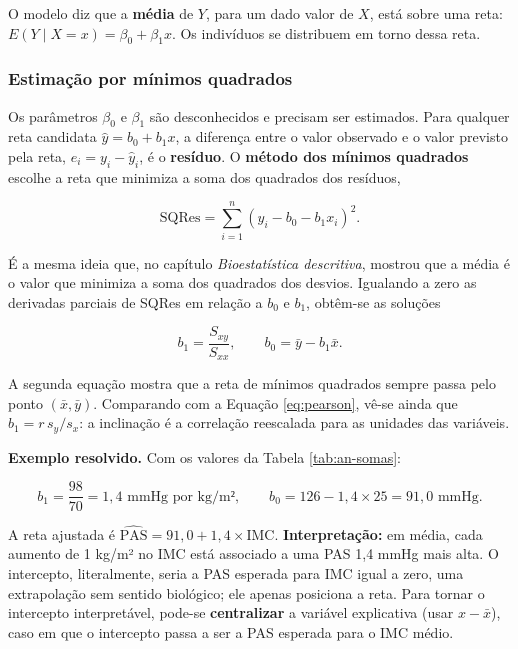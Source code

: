 \documentclass[
]{book}
\begin{document}
O modelo diz que a \textbf{média} de \(Y\), para um dado valor de \(X\), está sobre uma reta: \(E(Y \mid X = x) = \beta_0 + \beta_1 x\). Os indivíduos se distribuem em torno dessa reta.

\subsubsection{Estimação por mínimos quadrados}\label{estimauxe7uxe3o-por-muxednimos-quadrados}

Os parâmetros \(\beta_0\) e \(\beta_1\) são desconhecidos e precisam ser estimados. Para qualquer reta candidata \(\hat{y} = b_0 + b_1 x\), a diferença entre o valor observado e o valor previsto pela reta, \(e_i = y_i - \hat{y}_i\), é o \textbf{resíduo}. O \textbf{método dos mínimos quadrados} escolhe a reta que minimiza a soma dos quadrados dos resíduos,

\[
\text{SQRes} = \sum_{i=1}^{n}(y_i - b_0 - b_1 x_i)^2 .
\]

É a mesma ideia que, no capítulo \emph{Bioestatística descritiva}, mostrou que a média é o valor que minimiza a soma dos quadrados dos desvios. Igualando a zero as derivadas parciais de SQRes em relação a \(b_0\) e \(b_1\), obtêm-se as soluções

\begin{equation}
b_1 = \frac{S_{xy}}{S_{xx}}, \qquad b_0 = \bar{y} - b_1\bar{x}.
\label{eq:mq}
\end{equation}

A segunda equação mostra que a reta de mínimos quadrados sempre passa pelo ponto \((\bar{x}, \bar{y})\). Comparando com a Equação \eqref{eq:pearson}, vê-se ainda que \(b_1 = r\,s_y/s_x\): a inclinação é a correlação reescalada para as unidades das variáveis.

\textbf{Exemplo resolvido.} Com os valores da Tabela \ref{tab:an-somas}:

\[
b_1 = \frac{98}{70} = 1{,}4 \text{ mmHg por kg/m²}, \qquad b_0 = 126 - 1{,}4 \times 25 = 91{,}0 \text{ mmHg}.
\]

A reta ajustada é \(\widehat{\text{PAS}} = 91{,}0 + 1{,}4 \times \text{IMC}\). \textbf{Interpretação:} em média, cada aumento de 1 kg/m² no IMC está associado a uma PAS 1,4 mmHg mais alta. O intercepto, literalmente, seria a PAS esperada para IMC igual a zero, uma extrapolação sem sentido biológico; ele apenas posiciona a reta. Para tornar o intercepto interpretável, pode-se \textbf{centralizar} a variável explicativa (usar \(x - \bar{x}\)), caso em que o intercepto passa a ser a PAS esperada para o IMC médio.
\end{document}
